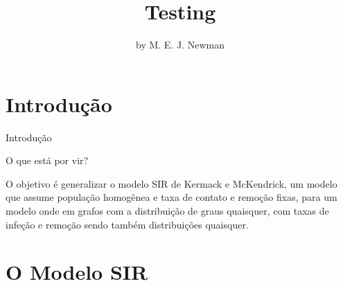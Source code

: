 \documentclass{beamer}
\title{Testing}
\author[Kaique Oliveira]{by M. E. J. Newman}
\begin{document}
	\typesetFrontSlides



\section{Introdução}


\begin{frame}{Introdução}

    \begin{exampleblock}{O que está por vir?}

        O objetivo é generalizar o modelo SIR de Kermack e McKendrick, um modelo 
        que assume população homogênea e taxa de contato e remoção fixas, para um modelo 
        onde em grafos com a distribuição de graus quaisquer, com taxas de infeção e remoção 
        sendo também distribuições quaisquer.
    
    \end{exampleblock}
    
\end{frame}



\section{O Modelo SIR}
\end{document}
